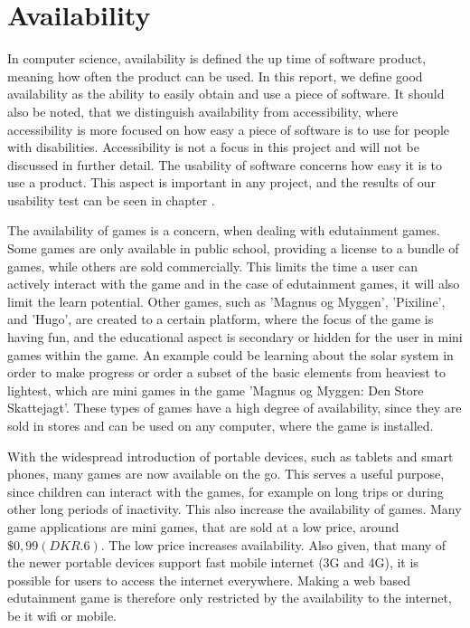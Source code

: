 \section{Availability}
\label{sec:availability}

In computer science, availability is defined the up time of software product, meaning how often the product can be used. \cite{defAvailability} In this report, we define good availability as the ability to easily obtain and use a piece of software. It should also be noted, that we distinguish availability from accessibility, where accessibility is more focused on how easy a piece of software is to use for people with disabilities. Accessibility is not a focus in this project and will not be discussed in further detail.  The usability of software concerns how easy it is to use a product.\cite{defUsability} This aspect is important in any project, and the results of our usability test can be seen in chapter .\newline

The availability of games is a concern, when dealing with edutainment games. Some games are only available in public school, providing a license to a bundle of games, while others are sold commercially. This limits the time a user can actively interact with the game and in the case of edutainment games, it will also limit the learn potential. Other games, such as 'Magnus og Myggen', 'Pixiline', and 'Hugo', are created to a certain platform, where the focus of the game is having fun, and the educational aspect is secondary or hidden for the user in mini games within the game. An example could be learning about the solar system in order to make progress or order a subset of the basic elements from heaviest to lightest, which are mini games in the game 'Magnus og Myggen: Den Store Skattejagt'. These types of games have a high degree of availability, since they are sold in stores and can be used on any computer, where the game is installed.\newline

With the widespread introduction of portable devices, such as tablets and smart phones, many games are now available on the go. This serves a useful purpose, since children can interact with the games, for example on long trips or during other long periods of inactivity. This also increase the availability of games. Many game applications are mini games, that are sold at a low price, around $\$0,99 (DKR. 6)$. The low price increases availability. Also given, that many of the newer portable devices support fast mobile internet (3G and 4G), it is possible for users to access the internet everywhere. Making a web based edutainment game is therefore only restricted by the availability to the internet, be it wifi or mobile.\newline

